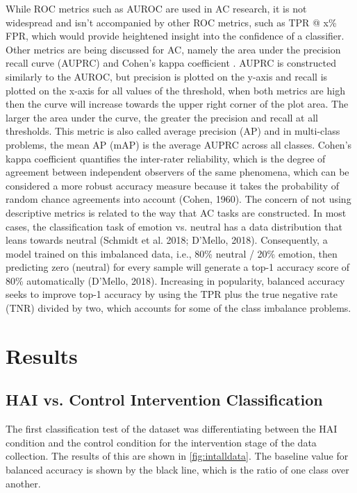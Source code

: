 \documentclass[12pt]{iopart}
\begin{document}
While ROC metrics such as AUROC are used in AC research, it is not widespread and isn’t accompanied by other ROC metrics, such as TPR @ x\% FPR, which would provide heightened insight into the confidence of a classifier.  Other metrics are being discussed for AC, namely the area under the precision recall curve (AUPRC) and Cohen’s kappa coefficient \cite{d2018affective}.  AUPRC is constructed similarly to the AUROC, but precision is plotted on the y-axis and recall is plotted on the x-axis for all values of the threshold, when both metrics are high then the curve will increase towards the upper right corner of the plot area.  The larger the area under the curve, the greater the precision and recall at all thresholds.  This metric is also called average precision (AP) and in multi-class problems, the mean AP (mAP) is the average AUPRC across all classes.  Cohen’s kappa coefficient quantifies the inter-rater reliability, which is the degree of agreement between independent observers of the same phenomena, which can be considered a more robust accuracy measure because it takes the probability of random chance agreements into account (Cohen, 1960).  The concern of not using descriptive metrics is related to the way that AC tasks are constructed.  In most cases, the classification task of emotion vs. neutral has a data distribution that leans towards neutral (Schmidt et al. 2018; D’Mello, 2018).  Consequently, a model trained on this imbalanced data, i.e., 80\% neutral / 20\% emotion, then predicting zero (neutral) for every sample will generate a top-1 accuracy score of 80\% automatically (D’Mello, 2018).  Increasing in popularity, balanced accuracy seeks to improve top-1 accuracy by using the TPR plus the true negative rate (TNR) divided by two, which accounts for some of the class imbalance problems.

\section*{Results}
\subsection*{HAI vs. Control Intervention Classification}

The first classification test of the dataset was differentiating between the HAI condition and the control condition for the intervention stage of the data collection.  The results of this are shown in \ref{fig:intalldata}.  The baseline value for balanced accuracy is shown by the black line, which is the ratio of one class over another.
\end{document}
